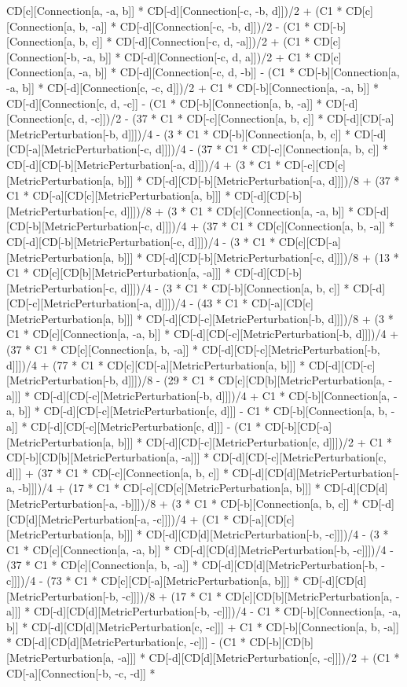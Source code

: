 CD[c][Connection[a, -a, b]] * CD[-d][Connection[-c, -b, d]])/2 + (C1 * CD[c][Connection[a, b, -a]] * CD[-d][Connection[-c, -b, d]])/2 - (C1 * CD[-b][Connection[a, b, c]] * CD[-d][Connection[-c, d, -a]])/2 + (C1 * CD[c][Connection[-b, -a, b]] * CD[-d][Connection[-c, d, a]])/2 + C1 * CD[c][Connection[a, -a, b]] * CD[-d][Connection[-c, d, -b]] - (C1 * CD[-b][Connection[a, -a, b]] * CD[-d][Connection[c, -c, d]])/2 + C1 * CD[-b][Connection[a, -a, b]] * CD[-d][Connection[c, d, -c]] - (C1 * CD[-b][Connection[a, b, -a]] * CD[-d][Connection[c, d, -c]])/2 - (37 * C1 * CD[-c][Connection[a, b, c]] * CD[-d][CD[-a][MetricPerturbation[-b, d]]])/4 - (3 * C1 * CD[-b][Connection[a, b, c]] * CD[-d][CD[-a][MetricPerturbation[-c, d]]])/4 - (37 * C1 * CD[-c][Connection[a, b, c]] * CD[-d][CD[-b][MetricPerturbation[-a, d]]])/4 + (3 * C1 * CD[-c][CD[c][MetricPerturbation[a, b]]] * CD[-d][CD[-b][MetricPerturbation[-a, d]]])/8 + (37 * C1 * CD[-a][CD[c][MetricPerturbation[a, b]]] * CD[-d][CD[-b][MetricPerturbation[-c, d]]])/8 + (3 * C1 * CD[c][Connection[a, -a, b]] * CD[-d][CD[-b][MetricPerturbation[-c, d]]])/4 + (37 * C1 * CD[c][Connection[a, b, -a]] * CD[-d][CD[-b][MetricPerturbation[-c, d]]])/4 - (3 * C1 * CD[c][CD[-a][MetricPerturbation[a, b]]] * CD[-d][CD[-b][MetricPerturbation[-c, d]]])/8 + (13 * C1 * CD[c][CD[b][MetricPerturbation[a, -a]]] * CD[-d][CD[-b][MetricPerturbation[-c, d]]])/4 - (3 * C1 * CD[-b][Connection[a, b, c]] * CD[-d][CD[-c][MetricPerturbation[-a, d]]])/4 - (43 * C1 * CD[-a][CD[c][MetricPerturbation[a, b]]] * CD[-d][CD[-c][MetricPerturbation[-b, d]]])/8 + (3 * C1 * CD[c][Connection[a, -a, b]] * CD[-d][CD[-c][MetricPerturbation[-b, d]]])/4 + (37 * C1 * CD[c][Connection[a, b, -a]] * CD[-d][CD[-c][MetricPerturbation[-b, d]]])/4 + (77 * C1 * CD[c][CD[-a][MetricPerturbation[a, b]]] * CD[-d][CD[-c][MetricPerturbation[-b, d]]])/8 - (29 * C1 * CD[c][CD[b][MetricPerturbation[a, -a]]] * CD[-d][CD[-c][MetricPerturbation[-b, d]]])/4 + C1 * CD[-b][Connection[a, -a, b]] * CD[-d][CD[-c][MetricPerturbation[c, d]]] - C1 * CD[-b][Connection[a, b, -a]] * CD[-d][CD[-c][MetricPerturbation[c, d]]] - (C1 * CD[-b][CD[-a][MetricPerturbation[a, b]]] * CD[-d][CD[-c][MetricPerturbation[c, d]]])/2 + C1 * CD[-b][CD[b][MetricPerturbation[a, -a]]] * CD[-d][CD[-c][MetricPerturbation[c, d]]] + (37 * C1 * CD[-c][Connection[a, b, c]] * CD[-d][CD[d][MetricPerturbation[-a, -b]]])/4 + (17 * C1 * CD[-c][CD[c][MetricPerturbation[a, b]]] * CD[-d][CD[d][MetricPerturbation[-a, -b]]])/8 + (3 * C1 * CD[-b][Connection[a, b, c]] * CD[-d][CD[d][MetricPerturbation[-a, -c]]])/4 + (C1 * CD[-a][CD[c][MetricPerturbation[a, b]]] * CD[-d][CD[d][MetricPerturbation[-b, -c]]])/4 - (3 * C1 * CD[c][Connection[a, -a, b]] * CD[-d][CD[d][MetricPerturbation[-b, -c]]])/4 - (37 * C1 * CD[c][Connection[a, b, -a]] * CD[-d][CD[d][MetricPerturbation[-b, -c]]])/4 - (73 * C1 * CD[c][CD[-a][MetricPerturbation[a, b]]] * CD[-d][CD[d][MetricPerturbation[-b, -c]]])/8 + (17 * C1 * CD[c][CD[b][MetricPerturbation[a, -a]]] * CD[-d][CD[d][MetricPerturbation[-b, -c]]])/4 - C1 * CD[-b][Connection[a, -a, b]] * CD[-d][CD[d][MetricPerturbation[c, -c]]] + C1 * CD[-b][Connection[a, b, -a]] * CD[-d][CD[d][MetricPerturbation[c, -c]]] - (C1 * CD[-b][CD[b][MetricPerturbation[a, -a]]] * CD[-d][CD[d][MetricPerturbation[c, -c]]])/2 + (C1 * CD[-a][Connection[-b, -c, -d]] * 
